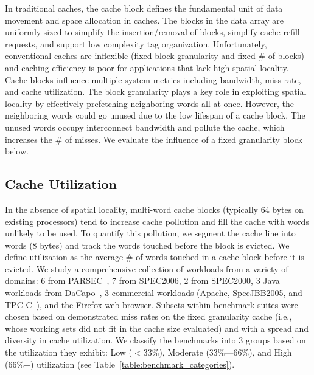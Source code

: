 In traditional caches, the cache block defines the fundamental unit of
data movement and space allocation in caches. The blocks in the data
array are uniformly sized to simplify the insertion/removal of blocks,
simplify cache refill requests, and support low complexity tag
organization. Unfortunately, conventional caches are inflexible (fixed
block granularity and fixed \# of blocks) and caching efficiency is
poor for applications that lack high spatial locality.  Cache blocks
influence multiple system metrics including bandwidth, miss rate, and
cache utilization. The block granularity plays a key role in
exploiting spatial locality by effectively prefetching neighboring
words all at once. However, the neighboring words could go unused due
to the low lifespan of a cache block. The unused words occupy
interconnect bandwidth and pollute the cache, which increases the \#
of misses. We evaluate the influence of a fixed
granularity block below.

\subsection{Cache Utilization}

In the absence of spatial locality, multi-word cache blocks (typically 64
bytes on existing processors) tend to increase cache pollution and fill the
cache with words unlikely to be used.  To quantify this pollution, we segment
the cache line into words (8 bytes) and track the words touched before the
block is evicted.  We define utilization as the average \# of words touched in
a cache block before it is evicted. We study a comprehensive collection of
workloads from a variety of domains: 6 from PARSEC~\cite{Bienia:2008:PBS:1454115.1454128}, 7 from
SPEC2006, 2 from SPEC2000, 3 Java workloads from DaCapo~\cite{Blackburn:2006:DBJ:1167473.1167488}, 3
commercial workloads (Apache, SpecJBB2005, and TPC-C~\cite{Llanos:2006:TOT:1228268.1228270}), and the
Firefox web browser.  Subsets within benchmark suites were chosen based on
demonstrated miss rates on the fixed granularity cache (i.e., whose working
sets did not fit in the cache size evaluated) and with a spread and diversity
in cache utilization.  We classify the benchmarks into 3 groups
based on the utilization they exhibit: Low ($<$33\%), Moderate (33\%---66\%),
and High (66\%+) utilization (see Table~\ref{table:benchmark_categories}).




